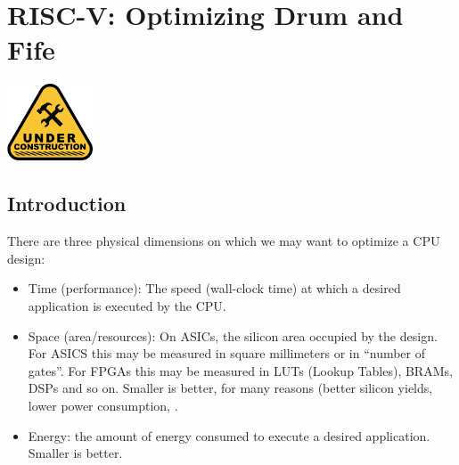 

\chapter{RISC-V: Optimizing Drum and Fife}


\setcounter{page}{1}
\renewcommand{\thepage}{\arabic{chapter}-\arabic{page}}

\label{ch_Optimization}


\vspace{2ex}

\centerline{\includegraphics[width=1in,angle=0]{Figures/Fig_Under_Construction}}

\vspace{2ex}


\section{Introduction}

There are three physical dimensions on which we may want to optimize a
CPU design:

\begin{itemize}

 \item Time (performance): The speed (wall-clock time) at which a
       desired application is executed by the CPU.

 \item Space (area/resources): On ASICs, the silicon area occupied by
       the design.  For ASICS this may be measured in square
       millimeters or in ``number of gates''.  For FPGAs this may be
       measured in LUTs (Lookup Tables), BRAMs, DSPs and so on.
       Smaller is better, for many reasons (better silicon yields,
       lower power consumption, {\etc}.

 \item Energy: the amount of energy consumed to execute a desired
       application. Smaller is better.

\end{itemize}

